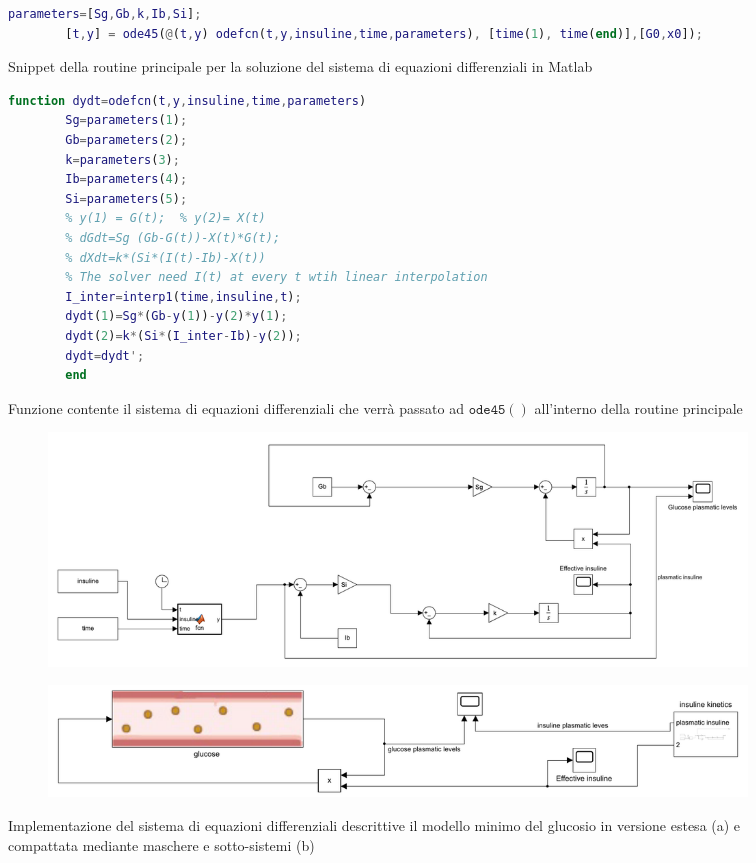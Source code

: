 \begin{figure}[t!]
	\begin{lstlisting}[language=matlab]
		parameters=[Sg,Gb,k,Ib,Si];
		[t,y] = ode45(@(t,y) odefcn(t,y,insuline,time,parameters), [time(1), time(end)],[G0,x0]);	
	\end{lstlisting}
	\caption{Snippet della routine principale per la soluzione del sistema di equazioni differenziali in Matlab}
	\label{fig:code1}
	\vspace{0.5cm}
	\begin{lstlisting}[language=matlab]
		function dydt=odefcn(t,y,insuline,time,parameters)
		Sg=parameters(1);
		Gb=parameters(2);
		k=parameters(3);
		Ib=parameters(4);
		Si=parameters(5);
		% y(1) = G(t); 	% y(2)= X(t)
		% dGdt=Sg (Gb-G(t))-X(t)*G(t); 	
		% dXdt=k*(Si*(I(t)-Ib)-X(t)) 
		% The solver need I(t) at every t wtih linear interpolation 
		I_inter=interp1(time,insuline,t);
		dydt(1)=Sg*(Gb-y(1))-y(2)*y(1);
		dydt(2)=k*(Si*(I_inter-Ib)-y(2));
		dydt=dydt'; 
		end
	\end{lstlisting}
	\caption{Funzione contente il sistema di equazioni differenziali che verrà passato ad $\mathtt{ode45()}$ all'interno della routine principale}
	\label{fig:code2}
\end{figure}

\begin{figure}[t!]
	\begin{subfigure}{0.95\linewidth}
		\centering
		\includegraphics[width=0.85\linewidth]{figures/simulink_extended}
		\caption{}
		\label{fig:simulinkextended}
	\end{subfigure}
	\begin{subfigure}{0.95\linewidth}
		\centering
		\includegraphics[width=0.85\linewidth]{figures/simulink}
		\caption{}
		\label{fig:simulinkcompact}
	\end{subfigure}
	\caption{Implementazione del sistema di equazioni differenziali descrittive il modello minimo del glucosio in versione estesa (a) e compattata mediante maschere e sotto-sistemi (b)}
	\label{fig:simulink}
\end{figure}

